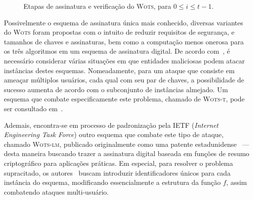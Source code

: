 \documentclass[12pt]{report}
\begin{document}
\begin{figure}[ht]
  \centering
  \caption{Etapas de assinatura e verificação do \textsc{Wots},
    para $0 \leq i \leq t - 1$.}
  \label{fig:5}
\end{figure}

Possivelmente o esquema de assinatura única mais conhecido, diversas variantes do
\textsc{Wots} foram propostas com o intuito de reduzir requisitos de segurança,
e tamanhos de chaves e assinaturas, bem como a computação menos onerosa para os
três algoritmos em um esquema de assinatura digital. De acordo
com~\cite{LafrancePhilip2017}, é necessário considerar várias situações em que
entidades maliciosas podem atacar instâncias destes esquemas. Nomeadamente, para
um ataque que consiste em ameaçar múltiplos usuários, cada qual com seu par de
chaves, a possibilidade de sucesso aumenta de acordo com o subconjunto de
instâncias almejado. Um esquema que combate especificamente este problema,
chamado de \textsc{Wots-t}, pode ser consultado em~\cite{Hulsing:2016:MMA:3081852.3081871}.

Ademais, encontra-se em processo de padronização pela IETF (\emph{Internet Engineering Task
Force}) outro esquema que combate este tipo de ataque, chamado \textsc{Wots-lm}, publicado
originalmente como uma patente estadunidense~\cite{lm-patent} --- desta maneira
buscando trazer a assinatura digital baseada em funções de resumo criptográfico
para aplicações práticas. Em especial, para resolver o problema supracitado, os
autores~\cite{mcgrew-hash-sigs-08} buscam introduzir identificadores únicos para cada instância do
esquema, modificando essencialmente a estrutura da função $f$, assim combatendo
ataques multi-usuário.
\end{document}
